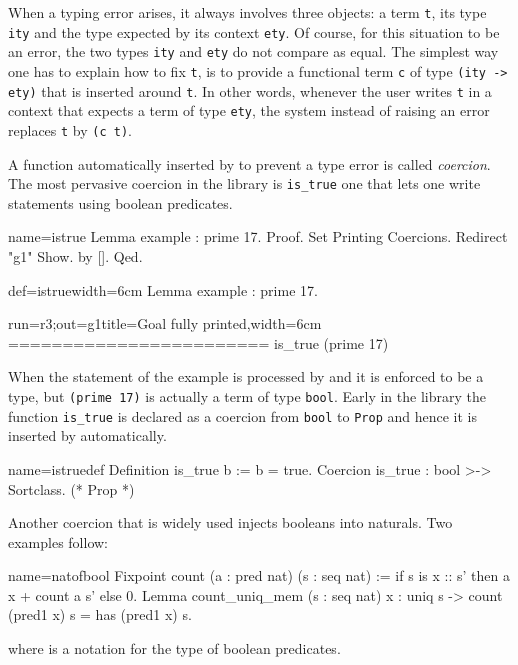 When a typing error arises, it always involves three objects:
a term \lstinline/t/, its type \lstinline/ity/ and the type
expected by its context \lstinline/ety/.  Of course, for this
situation to be an error, the two types \lstinline/ity/ and
\lstinline/ety/ do not compare as equal.
The simplest way one has to explain \Coq{} how to fix \lstinline/t/,
is to provide a functional term \lstinline/c/ of type
\lstinline/(ity -> ety)/ that is inserted around \lstinline/t/.
In other words, whenever the user writes \lstinline/t/ in a context
that expects a term of type \lstinline/ety/, the system instead of
raising an error replaces \lstinline/t/ by \lstinline/(c t)/.

A function automatically inserted by \Coq{} to prevent a type
error is called \emph{coercion}.
The most pervasive coercion in the \mcbMC{} library is
\lstinline/is_true/ one that lets one write statements using boolean
predicates.

\begin{coqdef}{name=istrue}
Lemma example : prime 17.
Proof.
Set Printing Coercions. Redirect "g1" Show.
by [].
Qed.
\end{coqdef}
\begin{coq-left}{def=istrue}{width=6cm}
Lemma example : prime 17.
$~$
\end{coq-left}
\begin{coqout-right}{run=r3;out=g1}{title=Goal fully printed,width=6cm}
========================
is_true (prime 17)
\end{coqout-right}

When the statement of the example is processed by \Coq{}
and it is enforced to be a type, but \lstinline/(prime 17)/ is actually
a term of type \lstinline/bool/.  Early in the library the
function \lstinline/is_true/ is declared as a coercion from
\lstinline/bool/ to \lstinline/Prop/ and hence it is inserted
by \Coq{} automatically.

\begin{coq}{name=istruedef}{}
Definition is_true b := b = true.
Coercion is_true : bool >-> Sortclass. (* Prop *)
\end{coq}

Another coercion that is widely used injects booleans into naturals.
Two examples follow:

\begin{coq}{name=natofbool}{}
Fixpoint count (a : pred nat) (s : seq nat) :=
  if s is x :: s' then a x + count a s' else 0.
Lemma count_uniq_mem (s : seq nat) x :
  uniq s -> count (pred1 x) s = has (pred1 x) s.
\end{coq}
where  is a notation for the type   of boolean
predicates.


